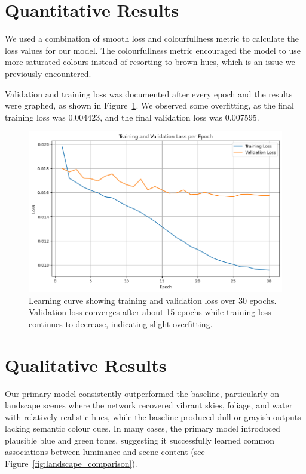 \documentclass{article} %
\begin{document}
\section{Quantitative Results}
\label{quant_results}

We used a combination of smooth loss and colourfullness metric to calculate the loss values for our model. The colourfullness metric encouraged the model to use more saturated colours
instead of resorting to brown hues, which is an issue we previously encountered. 

Validation and training loss was documented after every epoch and the results were graphed, as shown in Figure~\ref{fig:loss_curve}. We observed some overfitting, as the final 
training loss was 0.004423, and the final validation loss was 0.007595.

\begin{figure}[htbp]            %
  \centering
  \includegraphics[width=0.9\linewidth]{Figs/loss_curve.png}
  \caption{Learning curve showing training and validation loss over 30 epochs. Validation loss converges after about 15 epochs while training loss continues to decrease, indicating slight overfitting.}
  \label{fig:loss_curve}
\end{figure}

\section{Qualitative Results}
\label{qual_results}

Our primary model consistently outperformed the baseline, particularly on landscape scenes where the network recovered vibrant skies, foliage, and water with relatively realistic hues, 
while the baseline produced dull or grayish outputs lacking semantic colour cues. In many cases, the primary model introduced plausible blue and green tones, suggesting it successfully 
learned common associations between luminance and scene content (see Figure~\ref{fig:landscape_comparison}).
\end{document}
